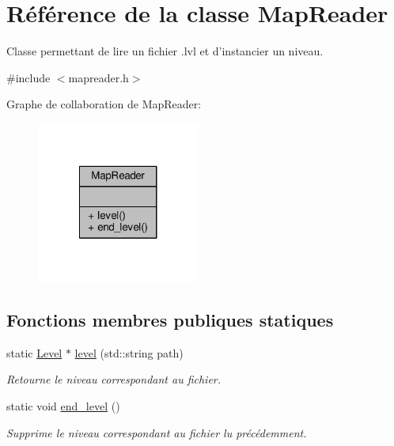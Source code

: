 \hypertarget{classMapReader}{\section{Référence de la classe Map\+Reader}
\label{classMapReader}
}


Classe permettant de lire un fichier .lvl et d'instancier un niveau.  




{\ttfamily \#include $<$mapreader.\+h$>$}



Graphe de collaboration de Map\+Reader\+:\nopagebreak
\begin{figure}[H]
\begin{center}
\leavevmode
\includegraphics[width=152pt]{d3/d63/classMapReader__coll__graph}
\end{center}
\end{figure}
\subsection*{Fonctions membres publiques statiques}
\begin{DoxyCompactItemize}
\item 
static \hyperlink{classLevel}{Level} $\ast$ \hyperlink{classMapReader_ac46cce595afc102320f6e73bb0748761}{level} (std\+::string path)
\begin{DoxyCompactList}\small\item\em Retourne le niveau correspondant au fichier. \end{DoxyCompactList}\item 
\hypertarget{classMapReader_afd2685d46bd9a935bf2c80a0c651898e}{static void \hyperlink{classMapReader_afd2685d46bd9a935bf2c80a0c651898e}{end\+\_\+level} ()}\label{classMapReader_afd2685d46bd9a935bf2c80a0c651898e}

\begin{DoxyCompactList}\small\item\em Supprime le niveau correspondant au fichier lu précédemment. \end{DoxyCompactList}\end{DoxyCompactItemize}


